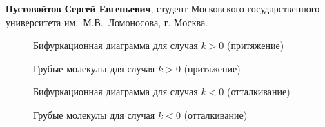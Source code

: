 {\bf Пустовойтов Сергей Евгеньевич}, студент Московского государственного университета им.~М.В.~Ломоносова, г. Москва.

\begin{figure}[h]
  \caption{Бифуркационная диаграмма для случая $k>0$ (притяжение)} \label{void}
\end{figure}

\begin{figure}[h]
  \caption{Грубые молекулы для случая $k>0$ (притяжение)}\label{void}
\end{figure}

\begin{figure}[h]
  \caption{Бифуркационная диаграмма для случая $k<0$ (отталкивание)}\label{void}
\end{figure}

\begin{figure}[h]
  \caption{Грубые молекулы для случая $k<0$ (отталкивание)}\label{void}
\end{figure}

